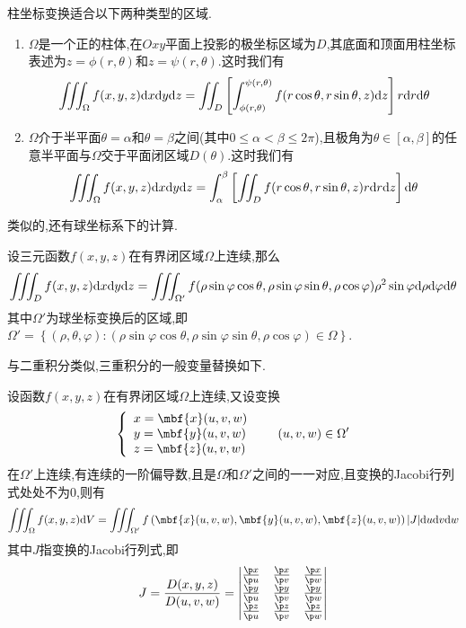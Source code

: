 \documentclass{ctexart}
\begin{document}
柱坐标变换适合以下两种类型的区域.
\begin{enumerate}[label=\tbf{(\arabic*)}]
    \item $\Omega$是一个正的柱体,在$Oxy$平面上投影的极坐标区域为$D$,其底面和顶面用柱坐标表述为$z=\phi(r,\theta)$和$z=\psi(r,\theta)$.这时我们有
        \[\iiint_\Omega f(x,y,z)\mathrm{d} x\mathrm{d} y\mathrm{d} z=\iint_D\left[\int_{\phi(r,\theta)}^{\psi(r,\theta)}f(r\cos\theta,r\sin\theta,z)\mathrm{d} z\right]r\mathrm{d} r\mathrm{d}\theta\]
    \item $\Omega$介于半平面$\theta=\alpha$和$\theta=\beta$之间(其中$0\leqslant\alpha<\beta\leqslant2\pi$),且极角为$\theta\in[\alpha,\beta]$的任意半平面与$\Omega$交于平面闭区域$D(\theta)$.这时我们有
        \[\iiint_\Omega f(x,y,z)\mathrm{d} x\mathrm{d} y\mathrm{d} z=\int_\alpha^\beta\left[\iint_Df(r\cos\theta,r\sin\theta,z)r\mathrm{d} r\mathrm{d} z\right]\mathrm{d}\theta\]
\end{enumerate}
类似的,还有球坐标系下的计算.
\begin{formal}[2.4 球坐标系下三重积分的计算]
    设三元函数$f(x,y,z)$在有界闭区域$\Omega$上连续,那么
    \[\iiint_{D}f(x,y,z)\mathrm{d} x\mathrm{d} y\mathrm{d} z=\iiint_{\Omega'}f(\rho\sin\varphi\cos\theta,\rho\sin\varphi\sin\theta,\rho\cos\varphi)\rho^2\sin\varphi\mathrm{d}\rho\mathrm{d}\varphi\mathrm{d}\theta\]
    其中$\Omega'$为球坐标变换后的区域,即$\Omega'=\left\{(\rho,\theta,\varphi):(\rho\sin\varphi\cos\theta,\rho\sin\varphi\sin\theta,\rho\cos\varphi)\in\Omega\right\}$.
\end{formal}\noindent
与二重积分类似,三重积分的一般变量替换如下.
\begin{formal}[2.5 一般变量替换下的三重积分的计算]
    设函数$f(x,y,z)$在有界闭区域$\Omega$上连续,又设变换
    \[\left\{\begin{array}{l}
        x=\mbf{x}(u,v,w)\\
        y=\mbf{y}(u,v,w)\\
        z=\mbf{z}(u,v,w)
    \end{array}\right.\ \ \ \ \ (u,v,w)\in\Omega'\]
    在$\Omega'$上连续,有连续的一阶偏导数,且是$\Omega$和$\Omega'$之间的一一对应,且变换的Jacobi行列式处处不为$0$,则有
    \[\iiint_{\Omega}f(x,y,z)\di V=\iiint_{\Omega'}f\left(\mbf{x}(u,v,w),\mbf{y}(u,v,w),\mbf{z}(u,v,w)\right)|J|\di u\di v\di w\]
    其中$J$指变换的Jacobi行列式,即
    \[J=\dfrac{D(x,y,z)}{D(u,v,w)}=\begin{vmatrix}
        \frac{\p x}{\p u} & \frac{\p x}{\p v} & \frac{\p x}{\p w} \\
        \frac{\p y}{\p u} & \frac{\p y}{\p v} & \frac{\p y}{\p w} \\
        \frac{\p z}{\p u} & \frac{\p z}{\p v} & \frac{\p z}{\p w}
    \end{vmatrix}\]
\end{formal}\noindent
\end{document}
